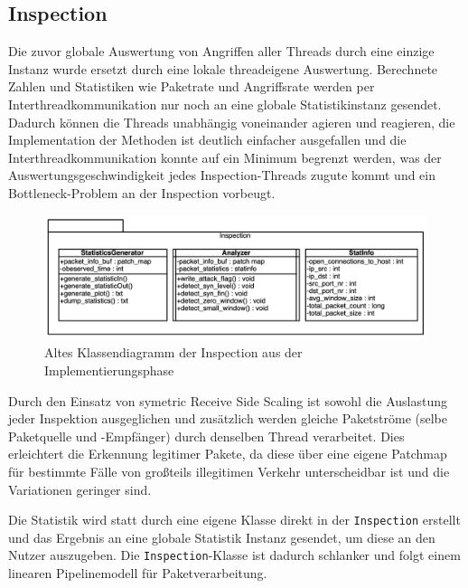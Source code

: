 \documentclass[../review_3.tex]{subfiles}
\begin{document}
\subsection{Inspection}
Die zuvor globale Auswertung von Angriffen aller Threads durch eine einzige Instanz wurde ersetzt durch eine lokale threadeigene Auswertung. Berechnete Zahlen und Statistiken wie Paketrate und Angriffsrate werden per Interthreadkommunikation nur noch an eine globale Statistikinstanz gesendet. Dadurch können die Threads unabhängig voneinander agieren und reagieren, die Implementation der Methoden ist deutlich einfacher ausgefallen und die Interthreadkommunikation konnte auf ein Minimum begrenzt werden, was der Auswertungsgeschwindigkeit jedes Inspection-Threads zugute kommt und ein Bottleneck-Problem an der Inspection vorbeugt.

\begin{figure}[h]
    \centering
    \includegraphics[width=\linewidth]{img/Inspection_old.png}
    \caption{Altes Klassendiagramm der Inspection aus der Implementierungsphase}
    \label{InspectionOld}
\end{figure}

Durch den Einsatz von symetric Receive Side Scaling ist sowohl die Auslastung jeder Inspektion ausgeglichen und zusätzlich werden gleiche Paketströme (selbe Paketquelle und -Empfänger) durch denselben Thread verarbeitet. Dies erleichtert die Erkennung legitimer Pakete, da diese über eine eigene Patchmap für bestimmte Fälle von großteils illegitimen Verkehr unterscheidbar ist und die Variationen geringer sind.

Die Statistik wird statt durch eine eigene Klasse direkt in der \texttt{Inspection} erstellt und das Ergebnis an eine globale Statistik Instanz gesendet, um diese an den Nutzer auszugeben. Die \texttt{Inspection}-Klasse ist dadurch schlanker und folgt einem linearen Pipelinemodell für Paketverarbeitung.
\end{document}
